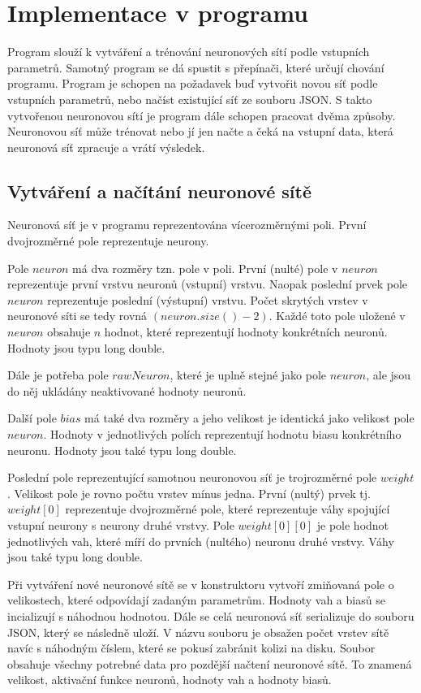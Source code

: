 \section{Implementace v programu}
Program slouží k vytváření a trénování neuronových sítí podle vstupních parametrů.
Samotný program se dá spustit s přepínači, které určují chování programu.
Program je schopen na požadavek buď vytvořit novou síť podle vstupních parametrů, nebo načíst existující síť ze souboru JSON.
S takto vytvořenou neuronovou sítí je program dále schopen pracovat dvěma způsoby.
Neuronovou síť může trénovat nebo jí jen načte a čeká na vstupní data, která neuronová síť zpracuje a vrátí výsledek.

\subsection{Vytváření a načítání neuronové sítě}
Neuronová síť je v programu reprezentována vícerozměrnými poli. První dvojrozměrné pole reprezentuje neurony.

Pole \(neuron\) má dva rozměry tzn. pole v poli.
První (nulté) pole v \(neuron\) reprezentuje první vrstvu neuronů (vstupní) vrstvu.
Naopak poslední prvek pole \(neuron\) reprezentuje poslední (výstupní) vrstvu.
Počet skrytých vrstev v neuronové síti se tedy rovná \((neuron.size() - 2)\).
Každé toto pole uložené v \(neuron\) obsahuje \(n\) hodnot, které reprezentují hodnoty konkrétních neuronů. Hodnoty jsou typu long double.

Dále je potřeba pole \(rawNeuron\), které je uplně stejné jako pole \(neuron\), ale jsou do něj ukládány neaktivované hodnoty neuronů.

Další pole \(bias\) má také dva rozměry a jeho velikost je identická jako velikost pole \(neuron\).
Hodnoty v jednotlivých polích reprezentují hodnotu biasu konkrétního neuronu. Hodnoty jsou také typu long double.

Poslední pole reprezentující samotnou neuronovou síť je trojrozměrné pole \(weight\). Velikost pole je rovno počtu vrstev mínus jedna.
První (nultý) prvek tj. \(weight[0]\) reprezentuje dvojrozměrné pole, které reprezentuje váhy spojující vstupní neurony s neurony druhé vrstvy.
Pole \(weight[0][0]\) je pole hodnot jednotlivých vah, které míří do prvních (nultého) neuronu druhé vrstvy. Váhy jsou také typu long double.

Při vytváření nové neuronové sítě se v konstruktoru vytvoří zmiňovaná pole o velikostech, které odpovídají zadaným parametrům.
Hodnoty vah a biasů se incializují s náhodnou hodnotou. Dále se celá neuronová síť serializuje do souboru JSON, který se následně uloží.
V názvu souboru je obsažen počet vrstev sítě navíc s náhodným číslem, které se pokusí zabránit kolizi na disku.
Soubor obsahuje všechny potrebné data pro pozdější načtení neuronové sítě.
To znamená velikost, aktivační funkce neuronů, hodnoty vah a hodnoty biasů.

